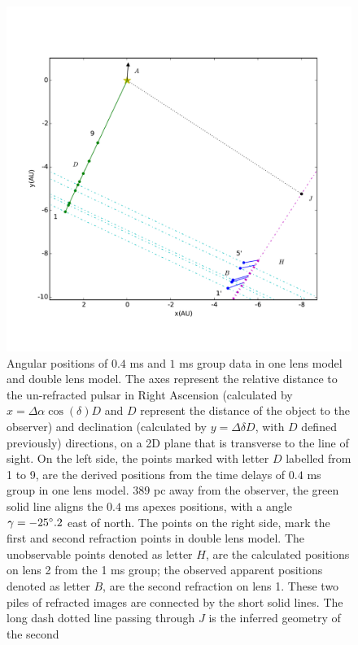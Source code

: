 \documentclass[useAMS,usenatbib]{mn2e}
\begin{document}
\begin{figure}
\centering
\includegraphics[width=7.5in]{Double_lens_xy.pdf}
\caption{Angular positions of $0.4$ ms and $1$ ms group data in one lens model and double lens model. The axes represent the relative distance to the un-refracted pulsar in Right Ascension (calculated by $x= \Delta \alpha \cos(\delta)D$ and $D$ represent the distance of the object to the observer) and declination (calculated by $y=\Delta \delta D$, with $D$ defined previously) directions, on a 2D plane that is transverse to the line of sight. %
On the left side, the points marked with letter $D$ labelled from 1 to 9, are the derived
positions from the time delays of $0.4$ ms group in 
one lens
model. $389$ pc away from the observer, the green solid line aligns the
$0.4$ ms apexes positions, with a angle $\gamma=-25\degree.2$ east of
north. The points on the right side, mark the first and second
refraction points in double lens model. The unobservable points
denoted as letter $H$, are the calculated positions on lens 2 from the
1
 ms group; the observed apparent positions denoted as letter $B$, are the  
second refraction on lens 1. These two piles of
refracted images are connected by the short solid lines. The long
dash dotted line passing through $J$ is the inferred geometry of the second
}
\end{figure}
\end{document}
